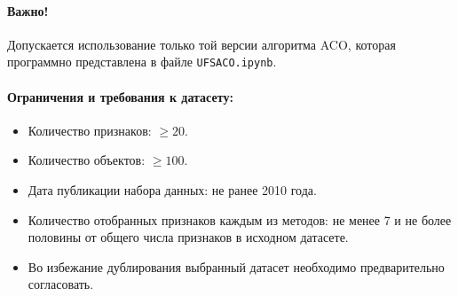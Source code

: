 \paragraph{Важно!} Допускается использование только той версии алгоритма ACO, которая программно представлена в файле \texttt{UFSACO.ipynb}.

\paragraph{Ограничения и требования к датасету:}
\begin{itemize}
    \item Количество признаков: $\ge 20$.
    \item Количество объектов: $\ge 100$.
    \item Дата публикации набора данных: не ранее 2010 года.
    \item Количество отобранных признаков каждым из методов: не менее 7 и не более половины от общего числа признаков в исходном датасете.
    \item Во избежание дублирования выбранный датасет необходимо предварительно согласовать.
\end{itemize}